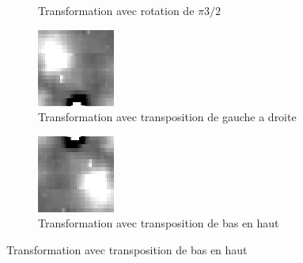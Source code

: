\documentclass[a4paper, 12pt, titlepage, oneside, french]{article}
\begin{document}
\begin{figure}[H]
\begin{subfigure}[t]{0.3\linewidth}
			\caption{Transformation avec rotation de $\pi3/2$}
		\end{subfigure}
		\begin{subfigure}[t]{0.3\linewidth}
			\includegraphics[width=\linewidth]{ExempleFlipX.png}
			\caption{Transformation avec transposition de gauche a droite}
		\end{subfigure}
		\begin{subfigure}[t]{0.3\linewidth}
			\includegraphics[width=\linewidth]{ExempleFlipY.png}
			\caption{Transformation avec transposition de bas en haut}
		\end{subfigure}



\end{figure}
\end{document}
